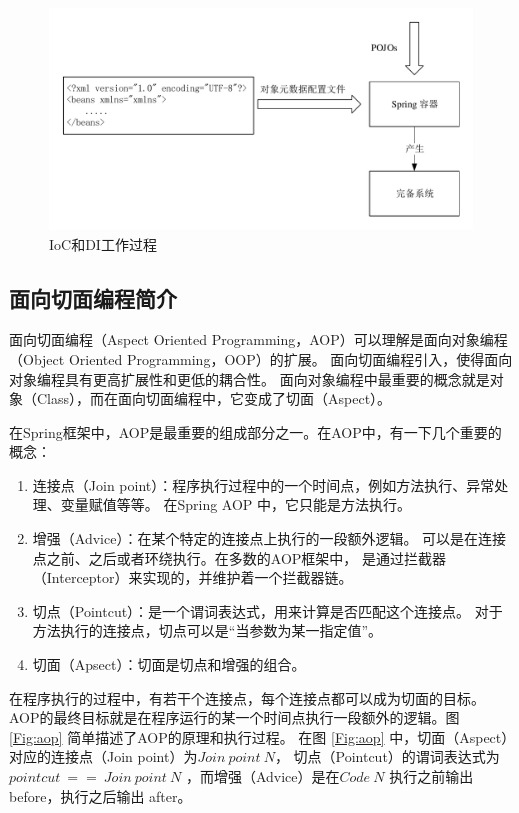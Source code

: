 \begin{figure}[ht]
    \centering   
    \includegraphics[width=1\linewidth]{./Figure/IMG_container.pdf}
    \caption{IoC和DI工作过程}\label{Fig:container}
\end{figure}

\subsection{面向切面编程简介}
面向切面编程（Aspect Oriented Programming，AOP）可以理解是面向对象编程（Object Oriented Programming，OOP）的扩展。
面向切面编程引入，使得面向对象编程具有更高扩展性和更低的耦合性。
面向对象编程中最重要的概念就是对象（Class），而在面向切面编程中，它变成了切面（Aspect）。

在Spring框架中，AOP是最重要的组成部分之一。在AOP中，有一下几个重要的概念：
\begin{enumerate}
    \item 连接点（Join point）：程序执行过程中的一个时间点，例如方法执行、异常处理、变量赋值等等。
    在Spring AOP 中，它只能是方法执行。
    \item 增强（Advice）：在某个特定的连接点上执行的一段额外逻辑。
    可以是在连接点之前、之后或者环绕执行。在多数的AOP框架中，
    是通过拦截器（Interceptor）来实现的，并维护着一个拦截器链。
    \item 切点（Pointcut）：是一个谓词表达式，用来计算是否匹配这个连接点。
    对于方法执行的连接点，切点可以是“当参数为某一指定值”。
    \item 切面（Apsect）：切面是切点和增强的组合。
\end{enumerate}

在程序执行的过程中，有若干个连接点，每个连接点都可以成为切面的目标。
AOP的最终目标就是在程序运行的某一个时间点执行一段额外的逻辑。图 \ref{Fig:aop} 
简单描述了AOP的原理和执行过程。
在图 \ref{Fig:aop} 中，切面（Aspect）对应的连接点（Join point）为$Join\ point\ N$，
切点（Pointcut）的谓词表达式为$ pointcut\ ==\ Join\ point\ N$
，而增强（Advice）是在$Code\ N$ 执行之前输出 before，执行之后输出 after。

